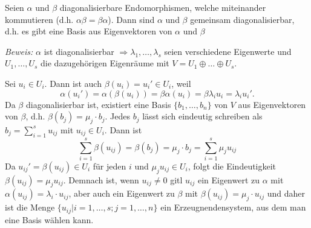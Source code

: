 \begin{mysatz} \qquad \par
    Seien $\alpha$ und $\beta$ diagonalisierbare Endomorphismen, welche miteinander kommutieren (d.h. $\alpha\beta=\beta\alpha$). Dann sind $\alpha$ und 
    $\beta$ gemeinsam diagonalisierbar, d.h. es gibt eine Basis aus Eigenvektoren von $\alpha$ und $\beta$

\textit{Beweis:}
    $\alpha$ ist diagonalisierbar $\Rightarrow \lambda_1,\ldots,\lambda_s$ seien verschiedene Eigenwerte und $U_1,\ldots,U_s$ die dazugehörigen 
    Eigenräume mit $V=U_1\oplus\ldots\oplus U_s$. \par \medskip
    Sei $u_i\in U_i$. Dann ist auch $\beta(u_i)=u_i'\in U_i$, weil
    \begin{equation*}
        \alpha(u_i')= \alpha(\beta(u_i)) = \beta\alpha(u_i) = \beta \lambda_i u_i = \lambda_i u_i'.
    \end{equation*}
    Da $\beta$ diagonalisierbar ist, existiert eine Basis $\lbrace b_1,\ldots,b_n \rbrace$ von $V$ aus Eigenvektoren von $\beta$, d.h. 
    $\beta(b_j)=\mu_j\cdot b_j$. Jedes $b_j$ lässt sich eindeutig schreiben als $\displaystyle{b_j=\sum_{i=1}^s u_{ij}}$ mit $u_{ij}\in U_i.$ Dann ist
    \begin{equation*}
        \sum_{i=1}^s \beta(u_{ij}) = \beta(b_j)=\mu_j\cdot b_j = \sum_{i=1}^s\mu_j u_{ij}
    \end{equation*}
    Da $u_{ij}'=\beta(u_{ij})\in U_i$ für jeden $i$ und $\mu_ju_{ij}\in U_i$, folgt die Eindeutigkeit $\beta(u_{ij})=\mu_j u_{ij}$. Demnach ist, wenn 
    $u_{ij}\neq0$ gitl $u_{ij}$ ein Eigenwert zu $\alpha$ mit $\alpha(u_{ij})=\lambda_i\cdot u_{ij}$, aber auch ein Eigenwert zu $\beta$ mit 
    $\beta(u_{ij})=\mu_j\cdot u_{ij}$ und daher ist die Menge $\lbrace u_{ij}|i=1,\ldots,s;j=1,\ldots,n \rbrace$ ein Erzeugnendensystem, aus dem man 
    eine Basis wählen kann.
\end{mysatz}

